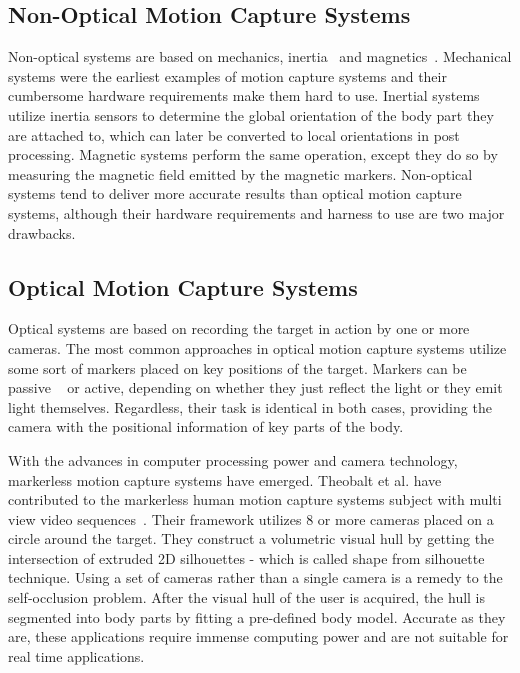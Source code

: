 \subsection{Non-Optical Motion Capture Systems}
 
Non-optical systems are based on mechanics, inertia~\cite{Miller2004} and magnetics~\cite{Yabukami2000}. Mechanical systems were the earliest examples of motion capture systems and their cumbersome hardware requirements make them hard to use. Inertial systems utilize inertia sensors to determine the global orientation of the body part they are attached to, which can later be converted to local orientations in post processing. Magnetic systems perform the same operation, except they do so by measuring the magnetic field emitted by the magnetic markers. Non-optical systems tend to deliver more accurate results than optical motion capture systems, although their hardware requirements and harness to use are two major drawbacks. 
 
\subsection{Optical Motion Capture Systems}

Optical systems are based on recording the target in action by one or more cameras. The most common approaches in optical motion capture systems utilize some sort of markers placed on key positions of the target. Markers can be passive ~\cite{Sementille2004} or active\cite{Maletsky2007}, depending on whether they just reflect the light or they emit light themselves. Regardless, their task is identical in both cases, providing the camera with the positional information of key parts of the body. 
 
With the advances in computer processing power and camera technology, markerless motion capture systems have emerged\cite{Cheung2003}. Theobalt et al. have contributed to the markerless human motion capture systems subject with multi view video sequences~\cite{Aguiar2007,Gall2009,Liu2011}. Their framework utilizes 8 or more cameras placed on a circle around the target. They construct a volumetric visual hull by getting the intersection of extruded 2D silhouettes - which is called shape from silhouette technique\cite{Cheung2000,Cheung2005}. Using a set of cameras rather than a single camera is a remedy to the self-occlusion problem. After the visual hull of the user is acquired, the hull is segmented into body parts by fitting a pre-defined body model. Accurate as they are, these
applications require immense computing power and are not suitable for real time applications. 
 
